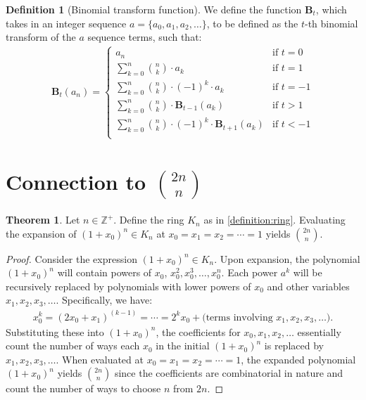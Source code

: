 \documentclass{article}
\theoremstyle{plain}
\theoremstyle{definition}
\newtheorem{definition}{Definition}
\newtheorem{theorem}{Theorem}
\newcommand{\Z}{\mathbb{Z}}
\newcommand{\K}{K}
\newcommand{\BT}{\textbf{B}}
\begin{document}
\begin{definition}[Binomial transform function] \label{definition:binomialtransforms}
We define the function $\BT_t$, which takes in an integer sequence $a = \{ a_0, a_1, a_2, \ldots \}$, to be defined as the $t$-th binomial transform of the $a$ sequence terms, such that:
\begin{align*}
    \BT_{t}(a_n) =
    \begin{cases}
        a_n &\text{if } t = 0 \\
        \sum_{k=0}^{n} \binom{n}{k} \cdot a_k &\text{if } t = 1 \\
        \sum_{k=0}^{n} \binom{n}{k} \cdot (-1)^k \cdot a_k  &\text{if } t = -1 \\
        \sum_{k=0}^{n} \binom{n}{k} \cdot \BT_{t-1}(a_k) &\text{if } t > 1 \\
        \sum_{k=0}^{n} \binom{n}{k} \cdot (-1)^k \cdot \BT_{t+1}(a_k) &\text{if } t < -1 \\
    \end{cases}
\end{align*}
\end{definition}

\section[Connection to Central Binomial Coefficients]{Connection to $\binom{2n}{n}$}
\begin{theorem}
\label{theorem:cbc}
Let $n \in \Z^+$. Define the ring $\K_n$ as in \cref{definition:ring}. Evaluating the expansion of $(1+x_0)^n \in \K_n$ at $x_0=x_1=x_2=\cdots=1$ yields $\binom{2n}{n}$.
\end{theorem}
\begin{proof}
Consider the expression $(1+x_0)^n \in \K_n$. Upon expansion, the polynomial $(1+x_0)^n$ will contain powers of $x_0$, $x_0^2, x_0^3, \ldots, x_0^n$. Each power $a^k$ will be recursively replaced by polynomials with lower powers of $x_0$ and other variables $x_1, x_2, x_3, \ldots$. Specifically, we have:
\begin{align*}
    x_0^k = (2x_0+x_1)^{(k-1)} = \cdots = 2^k x_0 + \text{(terms involving $x_1, x_2, x_3, \ldots$)}.
\end{align*}
Substituting these into $(1+x_0)^n$, the coefficients for $x_0, x_1, x_2, \ldots$ essentially count the number of ways each $x_0$ in the initial $(1+x_0)^n$ is replaced by $x_1, x_2, x_3, \ldots$. When evaluated at $x_0=x_1=x_2=\cdots=1$, the expanded polynomial $(1+x_0)^n$ yields $\binom{2n}{n}$ since the coefficients are combinatorial in nature and count the number of ways to choose $n$ from $2n$.
\end{proof}
\end{document}
